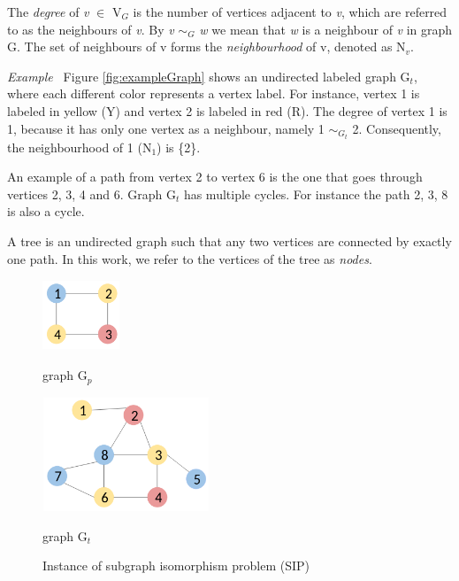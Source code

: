 \documentclass{l4proj}
\newcounter{example}[section]
\newenvironment{example}[1][]{\refstepcounter{example}\par\medskip
   \noindent \textit{Example~\theexample #1} \rmfamily}{\medskip}
\begin{document}
The \emph{degree} of \emph{v} $\in$ V$_{G}$ is the number of vertices adjacent to \emph{v}, which are referred to as the neighbours of \emph{v}. By \emph{v} $\sim_{G}$ \textit{w} we mean that \textit{w} is a neighbour of \emph{v} in graph G. The set of neighbours of v forms the \emph{neighbourhood} of v, denoted as N$_{v}$. 

\begin{example}
Figure \ref{fig:exampleGraph} shows an undirected labeled graph G$_{t}$, where each different color represents a vertex label. For instance, vertex 1 is labeled in yellow (Y) and vertex 2 is labeled in red (R). The degree of vertex 1 is 1, because it has only one vertex as a neighbour, namely 1 $\sim_{G_{t}}$ 2. Consequently, the neighbourhood of 1 (N$_{1}$) is \{2\}.

An example of a path from vertex 2 to vertex 6 is the one that goes through vertices 2, 3, 4 and 6. Graph G$_{t}$ has multiple cycles. For instance the path 2, 3, 8 is also a cycle.
\end{example}

A tree is an undirected graph such that any two vertices are connected by exactly one path. In this work, we refer to the vertices of the tree as \emph{nodes}.

\begin{figure}[H]
\centering
\begin{minipage}[t]{.4\textwidth}
  \centering
  \includegraphics[height=2.1cm,width=2.3cm]{images/graphs/exampleGraph2.png}
  \caption{graph G$_{p}$}
  \label{fig:exampleGraph2}
\end{minipage}%
\begin{minipage}[t]{.6\textwidth}
  \centering
  \includegraphics[height=3.4cm,width=5cm]{images/graphs/exampleGraph.png}
  \caption{graph G$_{t}$}
  \label{fig:exampleGraph}
\end{minipage}%
\caption{Instance of subgraph isomorphism problem (SIP)}
\label{fig:SIP}
\end{figure}
\end{document}
